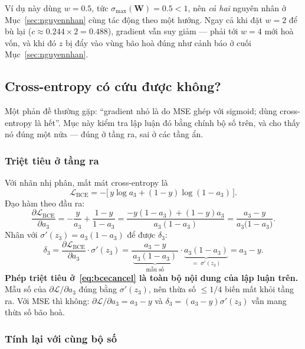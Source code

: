\begin{notebox}
Ví dụ này dùng $w = 0.5$, tức $\sigma_{\max}(\mathbf{W}) = 0.5 < 1$, nên
\emph{cả hai} nguyên nhân ở Mục~\ref{sec:nguyennhan} cùng tác động theo một
hướng. Ngay cả khi đặt $w = 2$ để bù lại ($c \approx 0.244\times 2 = 0.488$),
gradient vẫn suy giảm --- phải tới $w = 4$ mới hoà vốn, và khi đó $z$ bị đẩy vào
vùng bão hoà đúng như cảnh báo ở cuối Mục~\ref{sec:nguyennhan}.
\end{notebox}

\subsection{Cross-entropy có cứu được không?}

Một phản đề thường gặp: ``gradient nhỏ là do MSE ghép với sigmoid; dùng
cross-entropy là hết''. Mục này kiểm tra lập luận đó bằng chính bộ số trên, và
cho thấy nó đúng một nửa --- đúng ở tầng ra, sai ở các tầng ẩn.

\subsubsection{Triệt tiêu ở tầng ra}

Với nhãn nhị phân, mất mát cross-entropy là
\[
  \mathcal{L}_{\text{BCE}} = -\bigl[\,y\log a_3 + (1-y)\log(1-a_3)\,\bigr].
\]
Đạo hàm theo đầu ra:
\[
  \frac{\partial\mathcal{L}_{\text{BCE}}}{\partial a_3}
  = -\frac{y}{a_3} + \frac{1-y}{1-a_3}
  = \frac{-y(1-a_3) + (1-y)a_3}{a_3(1-a_3)}
  = \frac{a_3 - y}{a_3\bigl(1-a_3\bigr)} .
\]
Nhân với $\sigma'(z_3) = a_3(1-a_3)$ để được $\delta_3$:
\begin{equation}
  \delta_3
  = \frac{\partial\mathcal{L}_{\text{BCE}}}{\partial a_3}\cdot\sigma'(z_3)
  = \frac{a_3-y}{\,\underbrace{a_3(1-a_3)}_{\text{mẫu số}}\,}
    \cdot\underbrace{a_3(1-a_3)}_{=\;\sigma'(z_3)}
  = a_3 - y .
  \label{eq:bcecancel}
\end{equation}
\textbf{Phép triệt tiêu ở~\eqref{eq:bcecancel} là toàn bộ nội dung của lập luận
trên.} Mẫu số của $\partial\mathcal{L}/\partial a_3$ đúng bằng $\sigma'(z_3)$,
nên thừa số $\le 1/4$ biến mất khỏi tầng ra. Với MSE thì không:
$\partial\mathcal{L}/\partial a_3 = a_3-y$ và $\delta_3 = (a_3-y)\sigma'(z_3)$
vẫn mang thừa số bão hoà.

\subsubsection{Tính lại với cùng bộ số}

